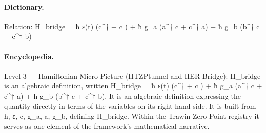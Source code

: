 \paragraph{Dictionary.}
Relation: H\_bridge = ħ ε(t) (c\textasciicircum{}† + c ) + ħ g\_a (a\textasciicircum{}† c + c\textasciicircum{}† a) + ħ g\_b (b\textasciicircum{}† c + c\textasciicircum{}† b)

\paragraph{Encyclopedia.}
Level 3 — Hamiltonian Micro Picture (HTZPtunnel and HER Bridge): H\_bridge is an algebraic definition, written H\_bridge = ħ ε(t) (c\textasciicircum{}† + c ) + ħ g\_a (a\textasciicircum{}† c + c\textasciicircum{}† a) + ħ g\_b (b\textasciicircum{}† c + c\textasciicircum{}† b). It is an algebraic definition expressing the quantity directly in terms of the variables on its right-hand side. It is built from ħ, ε, c, g\_a, a, g\_b, defining H\_bridge. Within the Trawin Zero Point registry it serves as one element of the framework's mathematical narrative.
